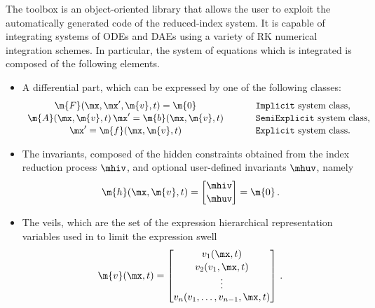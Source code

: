 The \Indigo{} \Matlab{} toolbox is an object-oriented library that allows the user to exploit the automatically generated code of the reduced-index system. It is capable of integrating systems of \acp{ODE} and \acp{DAE} using a variety of \ac{RK} numerical integration schemes. In particular, the system of equations which is integrated is composed of the following elements.
%
\begin{itemize}
  \setlength{\itemsep}{0.0em}
  \item A differential part, which can be expressed by one of the following classes:
  \begin{equation*}
      \begin{array}{ccl}
          \m{F}(\mx, \mx^\prime, \m{v}, t) = \m{0} & \hspace{0.5cm} &
          \text{\texttt{Implicit} system class,} \\[0.5mm]
          \m{A}(\mx, \m{v}, t) \, \mx^\prime = \m{b}(\mx, \m{v}, t) & \hspace{0.5cm} &
          \text{\texttt{SemiExplicit} system class,} \\[0.5mm]
          \mx^\prime = \m{f}(\mx, \m{v}, t) & \hspace{0.5cm} &
          \text{\texttt{Explicit} system class.}
      \end{array}
  \end{equation*}
  \item The invariants, composed of the hidden constraints obtained from the index reduction process $\mhiv$, and optional user-defined invariants $\mhuv$, namely
  \begin{equation*}
    \m{h}(\mx, \m{v}, t) = \begin{bmatrix}
        \mhiv \\[0.5mm]
        \mhuv
    \end{bmatrix} = \m{0} \, \text{.}
  \end{equation*}
  \item The veils, which are the set of the expression hierarchical representation variables used in \LEM{} to limit the expression swell
  \begin{equation*}
      \m{v}(\mx, t) = \begin{bmatrix}
          v_{1}(\mx, t) \\[0.5mm]
          v_{2}(v_{1}, \mx, t) \\
          \vdots \\
          v_{n}(v_{1}, \dots, v_{n-1}, \mx, t)
      \end{bmatrix} \, \text{.}
  \end{equation*}
\end{itemize}

